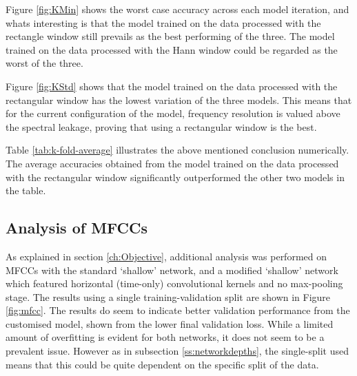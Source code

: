 \documentclass[class=report,11pt,crop=false]{standalone}
\begin{document}
Figure \ref{fig:KMin} shows the worst case accuracy across each model iteration, and whats interesting is that the model trained on the data processed with the rectangle window still prevails as the best performing of the three. The model trained on the data processed with the Hann window could be regarded as the worst of the three. 

Figure \ref{fig:KStd} shows that the model trained on the data processed with the rectangular window has the lowest variation of the  three models. This means that for the current configuration of the model, frequency resolution is valued above the spectral leakage, proving that using a rectangular window is the best. 

Table \ref{tab:k-fold-average} illustrates the above mentioned conclusion numerically. The average accuracies obtained from the model trained on the data processed with the rectangular window significantly outperformed the other two models in the table. 


\subsection{Analysis of MFCCs}

As explained in section \ref{ch:Objective}, additional analysis was performed on MFCCs with the standard `shallow' network, and a modified `shallow' network which featured horizontal (time-only) convolutional kernels and no max-pooling stage. The results using a single training-validation split are shown in Figure \ref{fig:mfcc}. The results do seem to indicate better validation performance from the customised model, shown from the lower final validation loss. While a limited amount of overfitting is evident for both networks, it does not seem to be a prevalent issue. However as in subsection \ref{ss:networkdepths}, the single-split used means that this could be quite dependent on the specific split of the data.
\end{document}

